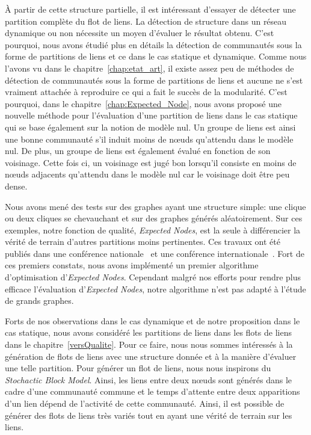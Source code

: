 \bigskip

\`A partir de cette structure partielle, il est intéressant d'essayer de détecter une partition complète du flot de liens.
La détection de structure dans un réseau dynamique ou non nécessite un moyen d'évaluer le résultat obtenu.
C'est pourquoi, nous avons étudié plus en détails la détection de communautés sous la forme de partitions de liens et ce dans le cas statique et dynamique.
Comme nous l'avons vu dans le chapitre~\ref{chap:etat_art}, il existe assez peu de méthodes de détection de communautés sous la forme de partitions de liens et aucune ne s'est vraiment attachée à reproduire ce qui a fait le succès de la modularité.
C'est pourquoi, dans le chapitre~\ref{chap:Expected_Node}, nous avons proposé une nouvelle méthode pour l'évaluation d'une partition de liens dans le cas statique qui se base également sur la notion de modèle nul.
Un groupe de liens est ainsi une bonne communauté s'il induit moins de n\oe{}uds qu'attendu dans le modèle nul.
De plus, un groupe de liens est également évalué en fonction de son voisinage.
Cette fois ci, un voisinage est jugé bon lorsqu'il consiste en moins de n\oe{}uds adjacents qu'attendu dans le modèle nul car le voisinage doit être peu dense.

Nous avons mené des tests sur des graphes ayant une structure simple: une clique ou deux cliques se chevauchant et sur des graphes générés aléatoirement.
Sur ces exemples, notre fonction de qualité, \emph{Expected Nodes}, est la seule à différencier la vérité de terrain d'autres partitions moins pertinentes.
Ces travaux ont été publiés dans une conférence nationale~\cite{Gaumont2014} et une conférence internationale~\cite{Gaumont2015}.
Fort de ces premiers constats, nous avons implémenté un premier algorithme d'optimisation d'\emph{Expected Nodes}.
Cependant malgré nos efforts pour rendre plus efficace l'évaluation d'\emph{Expected Nodes}, notre algorithme n'est pas adapté à l'étude de grands graphes.

\bigskip

Forts de nos observations dans le cas dynamique et de notre proposition dans le cas statique, nous avons considéré les partitions de liens dans les flots de liens dans le chapitre~\ref{versQualite}.
Pour ce faire, nous nous sommes intéressés à la génération de flots de liens avec une structure donnée et à la manière d'évaluer une telle partition.
Pour générer un flot de liens, nous nous inspirons du \emph{Stochactic Block Model}.
Ainsi, les liens entre deux n\oe{}uds sont générés dans le cadre d'une communauté commune et le temps d'attente entre deux apparitions d'un lien dépend de l'activité de cette communauté.
Ainsi, il est possible de générer des flots de liens très variés tout en ayant une vérité de terrain sur les liens.

